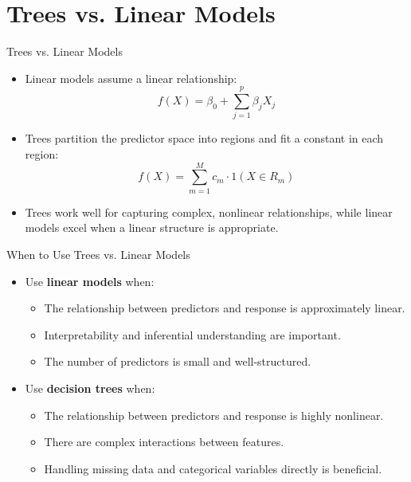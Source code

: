 \documentclass[aspectratio=169,xcolor=dvipsnames]{beamer}
\begin{document}
\section{Trees vs. Linear Models}
\begin{frame}{Trees vs. Linear Models}
    \begin{itemize}
        \item Linear models assume a linear relationship:
        \begin{equation}
            f(X) = \beta_0 + \sum_{j=1}^{p} \beta_j X_j
        \end{equation}
        \item Trees partition the predictor space into regions and fit a constant in each region:
        \begin{equation}
            f(X) = \sum_{m=1}^{M} c_m \cdot 1(X \in R_m)
        \end{equation}
        \item Trees work well for capturing complex, nonlinear relationships, while linear models excel when a linear structure is appropriate.
    \end{itemize}
\end{frame}

\begin{frame}{When to Use Trees vs. Linear Models}
    \begin{itemize}
    \setlength\itemsep{0.5cm}
        \item Use \textbf{linear models} when:
        \begin{itemize}
            \item The relationship between predictors and response is approximately linear.
            \item Interpretability and inferential understanding are important.
            \item The number of predictors is small and well-structured.
        \end{itemize}
        \item Use \textbf{decision trees} when:
        \begin{itemize}
            \item The relationship between predictors and response is highly nonlinear.
            \item There are complex interactions between features.
            \item Handling missing data and categorical variables directly is beneficial.
        \end{itemize}
    \end{itemize}
\end{frame}
\end{document}
